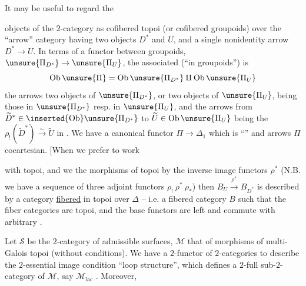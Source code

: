 It may be useful to regard the

objects of the $2$-category as cofibered topoi (or cofibered groupoids) over the ``arrow'' category
having two objects $D^*$ and $U$, and a single nonidentity arrow $D^*\to U$. In terms of a functor between groupoids, $\unsure{\Pi_{D^*}}\to\unsure{\Pi_U}$, the associated   (``in groupoids'') \inserted{$\unsure{\Pi}$} is   
\[
\mathrm{Ob}\,\unsure{\Pi}=\mathrm{Ob}\,\unsure{\Pi_{D^*}}\amalg\mathrm{Ob}\,\unsure{\Pi_U}
\]
the arrows   two objects of $\unsure{\Pi_{D^*}}$, or two objects of $\unsure{\Pi_U}$, being those in $\unsure{\Pi_{D^*}}$ resp. in $\unsure{\Pi_U}$, and the arrows from $\widetilde D^*\in\inserted{\mathrm{Ob}}\unsure{\Pi_{D^*}}$ to $\widetilde U\in\mathrm{Ob}\,\unsure{\Pi_U}$ being the  $\rho_!(\widetilde D^*)\xrightarrow{\sim}\widetilde U$ in .  We have a canonical functor $\Pi\to\Delta_1$ which is ``'' and    arrows  $\Pi$ cocartesian. [When we prefer to work

with topoi, and we  the morphisms \unsure{$\rho$} of topoi by the inverse image functors $\rho^*$ (N.B. we have a sequence of three adjoint functors $\rho_!\ \rho^*\ \rho_*$) then $B_U\xrightarrow{\rho^*}B_{D^*}$ is described by a category  \uline{fibered} in topoi over $\Delta$ -- i.e. a fibered category $B$ such that the fiber categories are topoi, and the base  functors are left  and commute with arbitrary \unsure{$\underset{\longrightarrow}{\lim}$}.

Let $\mathcal S$ be the $2$-category of admissible surfaces, $\mathcal M$ that of morphisms of multi-Galois topoi (without conditions). We have a $2$-functor of $2$-categories
 to describe the $2$-essential image  condition ``loop structure'',  which defines a $2$-full sub-$2$-category of $\mathcal M$, say $\mathcal M_{\mathrm{lac}}$ . Moreover,


